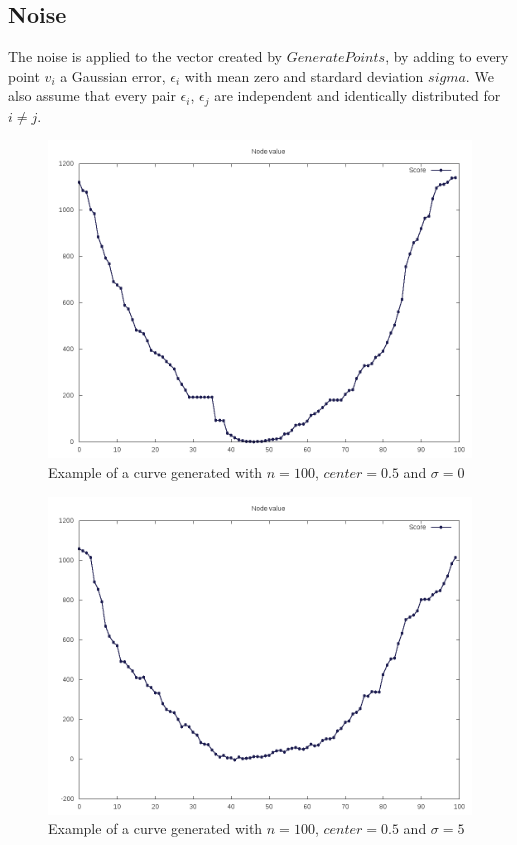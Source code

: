 \documentclass[12pt]{article}
\begin{document}
\subsection{Noise} \label{noise-section}
The noise is applied to the vector created by $GeneratePoints$, by adding to every point $v_i$ a Gaussian error, $\epsilon_i$ with mean zero and stardard deviation $sigma$. We also assume that every pair $\epsilon_i$, $\epsilon_j$  are independent and identically distributed for $i \neq j$.

\begin{figure}[H]
\caption{Example of a curve generated with $n = 100$, $center = 0.5$ and $\sigma = 0$}
\centering
\includegraphics[scale=.5]{curve_sigma0}
\end{figure}

\begin{figure}[H]
\caption{Example of a curve generated with $n = 100$, $center = 0.5$ and $\sigma = 5$}
\centering
\includegraphics[scale=.5]{curve_sigma5}
\end{figure}
\end{document}
